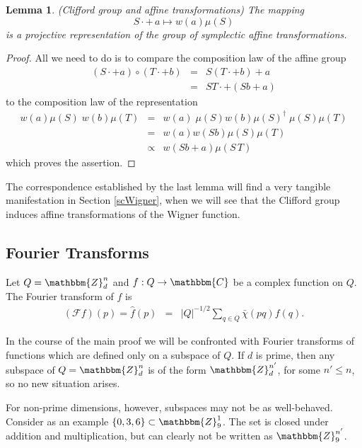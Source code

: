 \documentclass[aps,twocolumn,floatfix]{revtex4}
\newtheorem{lemma}[theorem]{Lemma}
\def\ZZ{\mathbbm{Z}}
\def\CC{\mathbbm{C}}
\def\Fou{\mathcal{F}}
\begin{document}
\begin{lemma} \emph{(Clifford group and affine transformations)}
	\label{cliffordAffine}
	The mapping
	\begin{equation*}
		S\cdot+\,a \mapsto w(a)\mu(S)
	\end{equation*}
	is a projective representation of the group of symplectic affine
	transformations.
\end{lemma}

\begin{proof}
	All we need to do is to compare the composition law of the affine
	group
	\begin{eqnarray*}
		(S\cdot+a)\circ(T\cdot+b) &=& S(T\cdot + b)+a \\
		&=& ST \cdot + (Sb +a)
	\end{eqnarray*}
	to the composition law of the representation
	\begin{eqnarray*}
		w(a)\mu(S)\;w(b)\mu(T) 
		&=& w(a)\;\mu(S)w(b)\mu(S)^\dagger\;\mu(S)\mu(T) \\
		&=& w(a) w(Sb) \mu(S)\mu(T) \\
		&\propto& w(Sb+a) \mu(S\,T)
	\end{eqnarray*}
	which proves the assertion. 
\end{proof}

The correspondence established by the last lemma will find a very
tangible manifestation in Section \ref{scWigner}, when we will see
that the Clifford group induces affine transformations of the Wigner
function.

\subsection{Fourier Transforms}
\label{scFourier}

Let $Q=\ZZ_d^n$ and $f: Q\to\CC$ be a complex function on $Q$. 
The Fourier transform of $f$ is
\begin{eqnarray}\label{fourierTrans}
	(\Fou f)(p) =\hat f(p)
	&=& |Q|^{-1/2} \sum_{q\in Q} \bar\chi(pq) f(q).
\end{eqnarray}

In the course of the main proof we will be confronted with Fourier
transforms of functions which are defined only on a subspace of $Q$.
If $d$ is prime, then any subspace of $Q=\ZZ_d^n$ is of the form
$\ZZ_d^{n'}$, for some $n'\leq n$, so no new situation arises. 

For non-prime dimensions, however, subspaces may not be as
well-behaved. Consider as an example $\{0,3,6\}\subset\ZZ_9^1$.  The
set is closed under addition and multiplication, but can clearly not
be written as $\ZZ_9^{n'}$. 
\end{document}
